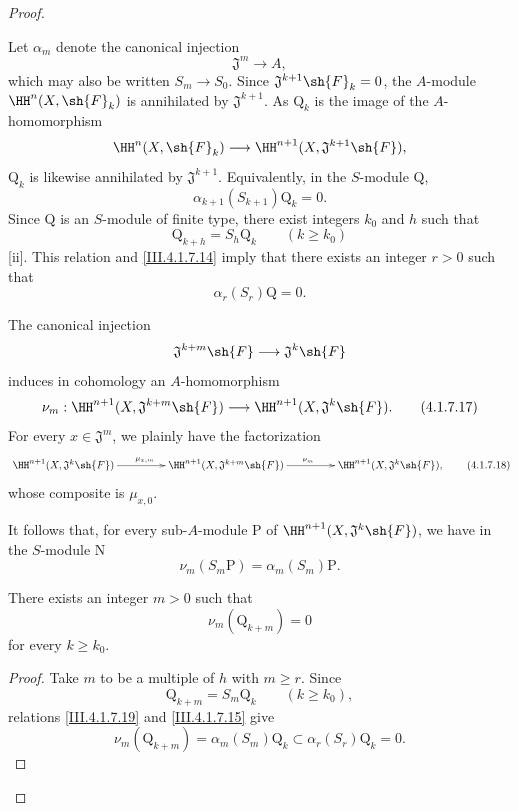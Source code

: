 \begin{proof}
\begin{env}[4.1.7.13]
\label{III.4.1.7.13}
Let $\alpha_m$ denote the canonical injection
\[
  \mathfrak{J}^m\longrightarrow A,
\]
which may also be written $S_m\to S_0$.
Since $\mathfrak{J}^{k+1}\sh{F}_k=0$, the $A$-module
$\HH^n(X,\sh{F}_k)$ is annihilated by $\mathfrak{J}^{k+1}$.
As $\mathrm{Q}_k$ is the image of the $A$-homomorphism
\[
  \HH^n(X,\sh{F}_k)
  \longrightarrow
  \HH^{n+1}(X,\mathfrak{J}^{k+1}\sh{F}),
\]
$\mathrm{Q}_k$ is likewise annihilated by $\mathfrak{J}^{k+1}$.
Equivalently, in the $S$-module $\mathrm{Q}$,
\[
  \alpha_{k+1}(S_{k+1})\mathrm{Q}_k=0.
  \tag{4.1.7.14}
  \label{III.4.1.7.14}
\]
Since $\mathrm{Q}$ is an $S$-module of finite type, there exist
integers $k_0$ and $h$ such that
\[
  \mathrm{Q}_{k+h}=S_h\mathrm{Q}_k
  \qquad(k\geq k_0)
\]
[ii].
This relation and \eqref{III.4.1.7.14} imply that there exists an
integer $r>0$ such that
\[
  \alpha_r(S_r)\mathrm{Q}=0.
  \tag{4.1.7.15}
  \label{III.4.1.7.15}
\]
\end{env}

\begin{env}[4.1.7.16]
\label{III.4.1.7.16}
The canonical injection
\[
  \mathfrak{J}^{k+m}\sh{F}
  \longrightarrow
  \mathfrak{J}^k\sh{F}
\]
induces in cohomology an $A$-homomorphism
\[
  \nu_m:
  \HH^{n+1}(X,\mathfrak{J}^{k+m}\sh{F})
  \longrightarrow
  \HH^{n+1}(X,\mathfrak{J}^k\sh{F}).
  \tag{4.1.7.17}
  \label{III.4.1.7.17}
\]
For every $x\in\mathfrak{J}^m$, we plainly have the factorization
\[
  \xymatrix@C=4.5em{
    \HH^{n+1}(X,\mathfrak{J}^k\sh{F})
      \ar[r]^{\mu_{x,m}}
    &
    \HH^{n+1}(X,\mathfrak{J}^{k+m}\sh{F})
      \ar[r]^{\nu_m}
    &
    \HH^{n+1}(X,\mathfrak{J}^k\sh{F}),
  }
  \tag{4.1.7.18}
  \label{III.4.1.7.18}
\]
whose composite is $\mu_{x,0}$.
\end{env}


It follows that, for every sub-$A$-module $\mathrm{P}$ of
$\HH^{n+1}(X,\mathfrak{J}^k\sh{F})$, we have in the $S$-module
$\mathrm{N}$
\[
  \nu_m(S_m\mathrm{P})
  =
  \alpha_m(S_m)\mathrm{P}.
  \tag{4.1.7.19}
  \label{III.4.1.7.19}
\]

\begin{lemma}[4.1.7.20]
\label{III.4.1.7.20}
There exists an integer $m>0$ such that
\[
  \nu_m(\mathrm{Q}_{k+m})=0
\]
for every $k\geq k_0$.
\end{lemma}

\begin{proof}
Take $m$ to be a multiple of $h$ with $m\geq r$.
Since
\[
  \mathrm{Q}_{k+m}=S_m\mathrm{Q}_k
  \qquad(k\geq k_0),
\]
relations \eqref{III.4.1.7.19} and \eqref{III.4.1.7.15} give
\[
  \nu_m(\mathrm{Q}_{k+m})
  =
  \alpha_m(S_m)\mathrm{Q}_k
  \subset
  \alpha_r(S_r)\mathrm{Q}_k
  =
  0.
\]
\end{proof}


\end{proof}
